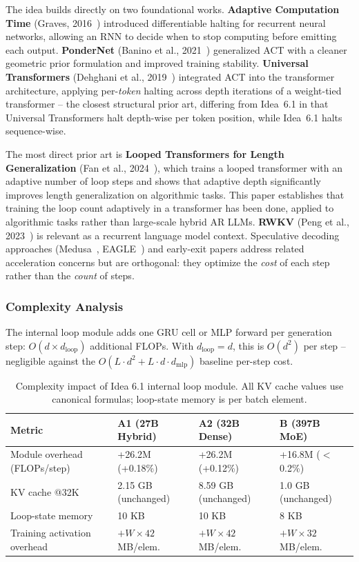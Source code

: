\documentclass[11pt]{article}
\begin{document}
The idea builds directly on two foundational works. \textbf{Adaptive Computation Time} (Graves, 2016~\cite{graves2016act}) introduced differentiable halting for recurrent neural networks, allowing an RNN to decide when to stop computing before emitting each output. \textbf{PonderNet} (Banino et al., 2021~\cite{banino2021pondernet}) generalized ACT with a cleaner geometric prior formulation and improved training stability. \textbf{Universal Transformers} (Dehghani et al., 2019~\cite{dehghani2019universal}) integrated ACT into the transformer architecture, applying per-\emph{token} halting across depth iterations of a weight-tied transformer -- the closest structural prior art, differing from Idea~6.1 in that Universal Transformers halt depth-wise per token position, while Idea~6.1 halts sequence-wise.

The most direct prior art is \textbf{Looped Transformers for Length Generalization} (Fan et al., 2024~\cite{fan2024looped}), which trains a looped transformer with an adaptive number of loop steps and shows that adaptive depth significantly improves length generalization on algorithmic tasks. This paper establishes that training the loop count adaptively in a transformer has been done, applied to algorithmic tasks rather than large-scale hybrid AR LLMs. \textbf{RWKV} (Peng et al., 2023~\cite{peng2023rwkv}) is relevant as a recurrent language model context. Speculative decoding approaches (Medusa~\cite{cai2024medusa}, EAGLE~\cite{li2024eagle}) and early-exit papers address related acceleration concerns but are orthogonal: they optimize the \emph{cost} of each step rather than the \emph{count} of steps.

\subsubsection*{Complexity Analysis}

The internal loop module adds one GRU cell or MLP forward per generation step: $O(d \times d_\text{loop})$ additional FLOPs. With $d_\text{loop} = d$, this is $O(d^2)$ per step -- negligible against the $O(L \cdot d^2 + L \cdot d \cdot d_\text{mlp})$ baseline per-step cost.

\begin{table}[h]
\centering
\caption{Complexity impact of Idea 6.1 internal loop module. All KV cache values use canonical formulas; loop-state memory is per batch element.}
\label{tab:idea61_complexity}
\small
\begin{tabular}{llll}
\hline
\textbf{Metric} & \textbf{A1 (27B Hybrid)} & \textbf{A2 (32B Dense)} & \textbf{B (397B MoE)} \\
\hline
Module overhead (FLOPs/step) & +26.2M (+0.18\%) & +26.2M (+0.12\%) & +16.8M ($<$0.2\%) \\
KV cache @32K & 2.15 GB (unchanged) & 8.59 GB (unchanged) & 1.0 GB (unchanged) \\
Loop-state memory & 10 KB & 10 KB & 8 KB \\
Training activation overhead & $+W \times 42$ MB/elem. & $+W \times 42$ MB/elem. & $+W \times 32$ MB/elem. \\
\hline
\end{tabular}
\end{table}
\end{document}
